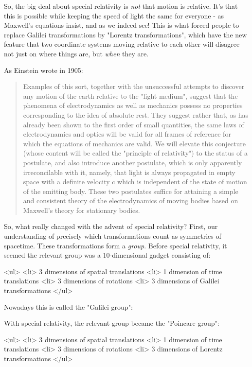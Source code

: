 So, the big deal about special relativity is \emph{not} that motion is
relative.  It's that this is possible while keeping the speed of 
light the same for everyone - as Maxwell's equations insist, and as 
we indeed see!  This is what forced people to replace Galilei
transformations by "Lorentz transformations", which have the 
new feature that two coordinate systems moving relative to each 
other will disagree not just on where things are, but \emph{when} they 
are.

As Einstein wrote in 1905:

\begin{quote}
 Examples of this sort, together with the unsuccessful attempts to
 discover any motion of the earth relative to the "light medium",
 suggest that the phenomena of electrodynamics as well as mechanics
 possess no properties corresponding to the idea of absolute rest.
 They suggest rather that, as has already been shown to the first
 order of small quantities, the same laws of electrodynamics and
 optics will be valid for all frames of reference for which the
 equations of mechanics are valid.  We will elevate this conjecture
 (whose content will be called the "principle of relativity") to
 the status of a postulate, and also introduce another postulate,
 which is only apparently irreconcilable with it, namely, that
 light is always propagated in empty space with a definite velocity
 c which is independent of the state of motion of the emitting
 body.  These two postulates suffice for attaining a simple and
 consistent theory of the electrodynamics of moving bodies based on
 Maxwell's theory for stationary bodies.
\end{quote}

So, what really changed with the advent of special relativity?  
First, our understanding of precisely which transformations count
as symmetries of spacetime.  These transformations form a \emph{group}.  
Before special relativity, it seemed the relevant group was a 
10-dimensional gadget consisting of:

<ul>
<li>
3 dimensions of spatial translations
<li>
1 dimension of time translations
<li>
3 dimensions of rotations
<li>
3 dimensions of Galilei transformations
</ul>

Nowadays this is called the "Galilei group":

With special relativity, the relevant group became the "Poincare 
group":

<ul>
<li>
3 dimensions of spatial translations
<li>
1 dimension of time translations
<li>
3 dimensions of rotations
<li>
3 dimensions of Lorentz transformations
</ul>

